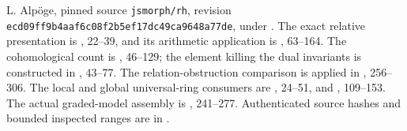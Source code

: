L. Alp\"oge, pinned source \texttt{jsmorph/rh}, revision
\texttt{ecd09ff9b4aaf6c08f2b5ef17dc49ca9648a77de}, under
.
The exact relative presentation is
, 22--39, and its arithmetic
application is , 63--164.
The cohomological count is
, 46--129; the element killing
the dual invariants is constructed in
,
43--77.  The relation-obstruction comparison is applied in
, 256--306.
The local and global universal-ring consumers are
, 24--51, and
, 109--153.
The actual graded-model assembly is
, 241--277.
Authenticated source hashes and bounded inspected ranges are in
.

